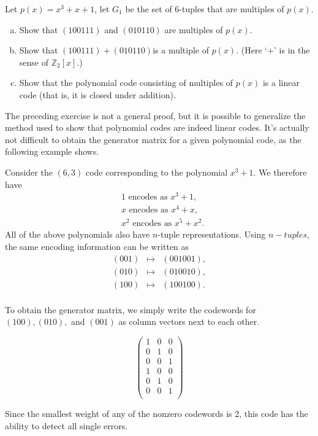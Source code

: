 \begin{exercise}{}
Let $p(x) = x^3 + x + 1$, let $G_1$ be the set of 6-tuples that are multiples of $p(x)$.
\begin{enumerate}[(a)]
\item
Show that $(100111)$ and $(010110)$ are multiples of 
$p(x)$.
\item
Show that $(100111)+(010110)$is a multiple of $p(x)$. (Here `+' is in the sense of $\mathbb{Z}_2[x]$.)
\item
Show that the polynomial code consisting of multiples of $p(x)$ is a linear code (that is, it is closed under addition).
\end{enumerate}
\end{exercise}

The preceding exercise is not a general proof, but it is possible to generalize the method used to show that polynomial codes are indeed linear codes. It's actually not difficult to obtain the generator matrix for a given polynomial code, as the following example shows.

\begin{example}{}
Consider the $(6,3)$ code corresponding to the polynomial $x^3+1$.  We therefore have
\begin{align*}
&1 \text{ encodes as }x^3+1,\\
&x \text{ encodes as }x^4+x,\\
&x^2 \text{ encodes as }x^5+x^2.
\end{align*}
All of the above polynomials also have $n$-tuple representations.  Using $n-tuples$, the same encoding information can be written as
\[
\begin{array}{rcl}
(001) & \mapsto & (001001),  \\
(010) & \mapsto & (010010) , \\
(100) & \mapsto & (100100). \\
\end{array}
\]

To obtain the generator matrix, we simply write the codewords for $(100), (010),$ and $(001)$ as column vectors next to each other.

\[\begin{pmatrix} 
1 & 0 & 0\\
0 & 1 & 0\\
0 & 0 & 1\\
1 & 0 & 0\\
0 & 1 & 0\\
0 & 0 & 1\\
\end{pmatrix}\]

Since the smallest weight of any of the nonzero codewords is 2, this code has the ability to detect all single errors.  

\end {example}

